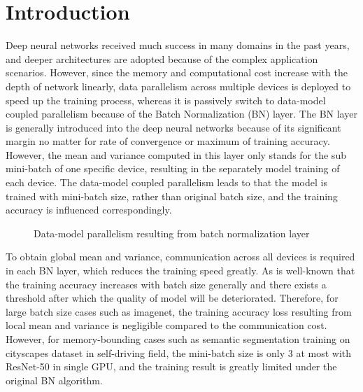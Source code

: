 \section{Introduction}

Deep neural networks received much success in many domains in the past years, and deeper architectures are adopted because of the complex application scenarios. However, since the memory and computational cost increase with the depth of network linearly, data parallelism across multiple devices is deployed to speed up the training process, whereas it is passively switch to data-model coupled parallelism because of the Batch Normalization (BN) layer\cite{ioffe2015batch}. The BN layer is generally introduced into the deep neural networks because of its significant margin no matter for rate of convergence or maximum of training accuracy. However, the mean and variance computed in this layer only stands for the sub mini-batch of one specific device, resulting in the separately model training of each device. The data-model coupled parallelism leads to that the model is trained with mini-batch size, rather than original batch size, and the training accuracy is influenced correspondingly.

\begin{figure}[b]
    \begin{center}
    \caption{Data-model parallelism resulting from batch normalization layer}%
    \label{fig:localBN}
    \end{center}
    \end{figure}

To obtain global mean and variance, communication across all devices is required in each BN layer, which reduces the training speed greatly. As is well-known that the training accuracy increases with batch size generally and there exists a threshold after which the quality of model will be deteriorated\cite{keskar2016large}. Therefore, for large batch size cases such as imagenet\cite{krizhevsky2012imagenet}, the training accuracy loss resulting from local mean and variance is negligible compared to the communication cost. However, for memory-bounding cases such as semantic segmentation training on cityscapes dataset in self-driving field, the mini-batch size is only 3 at most with ResNet-50 in single GPU, and the training result is greatly limited under the original BN algorithm.


